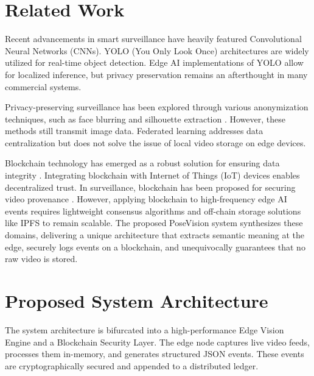 \documentclass[conference]{IEEEtran}
\begin{document}
\section{Related Work}
Recent advancements in smart surveillance have heavily featured Convolutional Neural Networks (CNNs). YOLO (You Only Look Once) architectures \cite{redmon2016you, bochkovskiy2020yolov4} are widely utilized for real-time object detection. Edge AI implementations of YOLO \cite{chen2019deep} allow for localized inference, but privacy preservation remains an afterthought in many commercial systems.

Privacy-preserving surveillance has been explored through various anonymization techniques, such as face blurring and silhouette extraction \cite{padilla2015privacy}. However, these methods still transmit image data. Federated learning \cite{mcmahan2017communication} addresses data centralization but does not solve the issue of local video storage on edge devices.

Blockchain technology has emerged as a robust solution for ensuring data integrity \cite{zheng2017overview}. Integrating blockchain with Internet of Things (IoT) devices \cite{christidis2016blockchains} enables decentralized trust. In surveillance, blockchain has been proposed for securing video provenance \cite{gipp2015decentralized}. However, applying blockchain to high-frequency edge AI events requires lightweight consensus algorithms and off-chain storage solutions like IPFS \cite{benet2014ipfs} to remain scalable. The proposed PoseVision system synthesizes these domains, delivering a unique architecture that extracts semantic meaning at the edge, securely logs events on a blockchain, and unequivocally guarantees that no raw video is stored.

\section{Proposed System Architecture}

The system architecture is bifurcated into a high-performance Edge Vision Engine and a Blockchain Security Layer. The edge node captures live video feeds, processes them in-memory, and generates structured JSON events. These events are cryptographically secured and appended to a distributed ledger.
\end{document}
